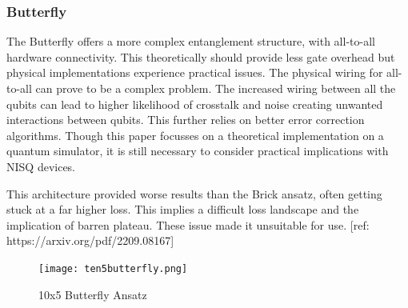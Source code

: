 \documentclass[12pt]{article}
\newcommand{\newp}
    {
    \vskip 0.5cm 
  }
\numberwithin{equation}{section}
\begin{document}
\subsubsection{Butterfly}
The Butterfly offers a more complex entanglement structure, with all-to-all hardware 
connectivity. This theoretically should provide less gate overhead but physical 
implementations experience practical issues. The physical wiring for all-to-all 
can prove to be a complex problem. The increased wiring between all the qubits 
can lead to higher likelihood of crosstalk and noise creating unwanted interactions 
between qubits. This further relies on better error correction algorithms. Though 
this paper focusses on a theoretical implementation on a quantum simulator, it 
is still necessary to consider practical implications with NISQ devices. 
\newp
This architecture provided worse results than the Brick ansatz, often getting 
stuck at a far higher loss. This implies a difficult loss landscape and the 
implication of barren plateau. These issue made it unsuitable for use. 
[ref: https://arxiv.org/pdf/2209.08167]
\begin{figure}[h!]
  \centering 
  \texttt{[image: ten5butterfly.png]}
  \caption{10x5 Butterfly Ansatz}
  \label{fig:butterfly}
\end{figure}
\newpage
\end{document}
